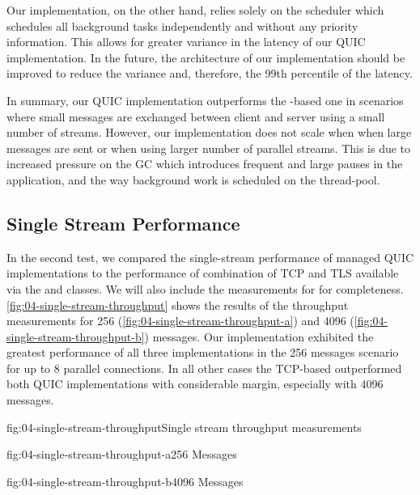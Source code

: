 Our implementation, on the other hand, relies solely on the \dotnet{}  scheduler which
schedules all background tasks independently and without any priority information. This allows for
greater variance in the latency of our QUIC implementation. In the future, the architecture of our
implementation should be improved to reduce the variance and, therefore, the 99th percentile of the
latency.

In summary, our QUIC implementation outperforms the \libmsquic{}-based one in scenarios where small
messages are exchanged between client and server using a small number of streams. However, our
implementation does not scale when when large messages are sent or when using larger number of
parallel streams. This is due to increased pressure on the GC which introduces frequent and large
pauses in the application, and the way background work is scheduled on the \dotnet{} thread-pool.

\subsection{Single Stream Performance}

In the second test, we compared the single-stream performance of managed QUIC implementations to the
performance of combination of TCP and TLS available via the \TcpClient{} and \SslStream{} \dotnet{}
classes. We will also include the measurements for \libmsquic{} for completeness.
\autoref{fig:04-single-stream-throughput} shows the results of the throughput measurements for
\SI{256}{\byte} (\autoref{fig:04-single-stream-throughput-a}) and \SI{4096}{\byte}
(\autoref{fig:04-single-stream-throughput-b}) messages. Our implementation exhibited the greatest
performance of all three implementations in the \SI{256}{\byte} messages scenario for up to 8
parallel connections. In all other cases the TCP-based \SslStream{} outperformed both QUIC
implementations with considerable margin, especially with \SI{4096}{\byte} messages.

\begin{myFigure}{fig:04-single-stream-throughput}{Single stream throughput measurements}
\begin{mySubfigure}{0.49\linewidth}{fig:04-single-stream-throughput-a}{\SI{256}{\byte} Messages}
\footnotesize

\end{mySubfigure}
\begin{mySubfigure}{0.49\linewidth}{fig:04-single-stream-throughput-b}{\SI{4096}{\byte} Messages}
\footnotesize

\end{mySubfigure}
\end{myFigure}

